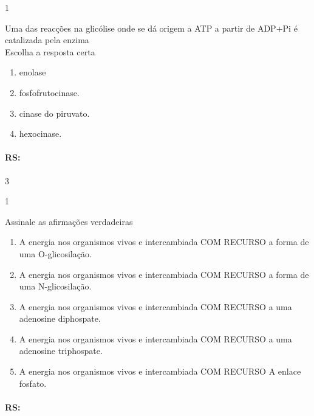 \documentclass[\mainfilename]{subfiles}
\begin{document}
\begin{questionBox}1{} %
    
    Uma das reacções na glicólise onde se dá origem a ATP a partir de ADP+Pi é catalizada pela enzima\\
    
    Escolha a resposta certa
    \begin{enumerate}
        \item enolase
        \item fosfofrutocinase.
        \item cinase do piruvato.
        \item hexocinase.
    \end{enumerate}

    \paragraph{RS:} 3
    
\end{questionBox}

\begin{questionBox}1{} %
    
    Assinale as afirmações verdadeiras
    \begin{enumerate}
        \item A energia nos organismos vivos e intercambiada COM RECURSO a forma de uma O-glicosilação.
        \item A energia nos organismos vivos e intercambiada COM RECURSO a forma de uma N-glicosilação.
        \item A energia nos organismos vivos e intercambiada COM RECURSO a uma adenosine diphospate. 
        \item A energia nos organismos vivos e intercambiada COM RECURSO a uma adenosine triphospate. 
        \item A energia nos organismos vivos e intercambiada COM RECURSO A enlace fosfato. 
    \end{enumerate}

    \paragraph{RS:}
    
\end{questionBox}
\end{document}
